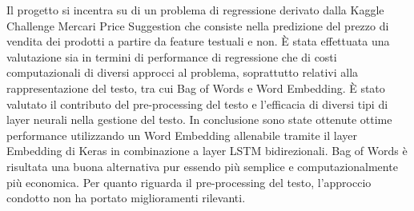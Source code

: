 
Il progetto si incentra su di un problema di regressione derivato dalla Kaggle
Challenge Mercari Price Suggestion che consiste nella predizione del prezzo di
vendita dei prodotti a partire da feature testuali e non. È stata effettuata una
valutazione sia in termini di performance di regressione che di costi
computazionali di diversi approcci al problema, soprattutto relativi alla
rappresentazione del testo, tra cui Bag of Words e Word Embedding. È stato
valutato il contributo del pre-processing del testo e l'efficacia di diversi
tipi di layer neurali nella gestione del testo. In conclusione sono state
ottenute ottime performance utilizzando un Word Embedding allenabile tramite il
layer Embedding di Keras in combinazione a layer LSTM bidirezionali. Bag of
Words è risultata una buona alternativa pur essendo più semplice e
computazionalmente più economica. Per quanto riguarda il pre-processing del
testo, l'approccio condotto non ha portato miglioramenti rilevanti.